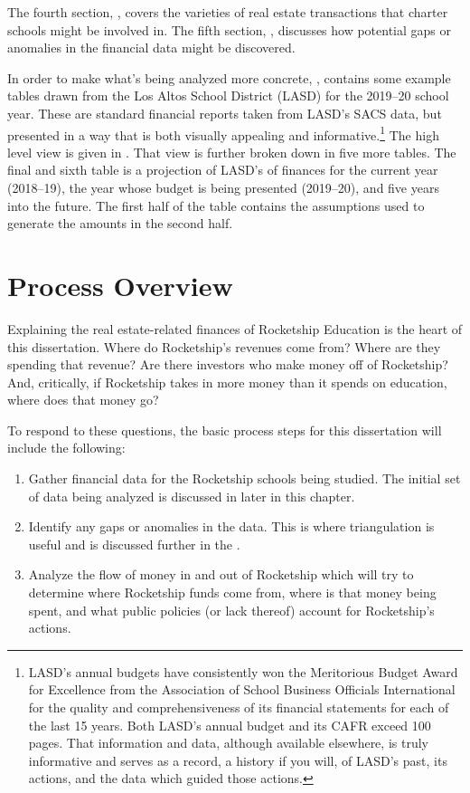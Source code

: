 The fourth section, , covers the varieties of real estate transactions that charter schools might be involved in. The fifth section, , discusses how potential gaps or anomalies in the financial data might be discovered. 

In order to make what's being analyzed more concrete, , contains some example tables drawn from the Los Altos School District (LASD) for the 2019–20 school year. These are standard financial reports taken from LASD's SACS data, but presented in a way that is both visually appealing and informative.\footnote{LASD's annual budgets have consistently won the Meritorious Budget Award for Excellence from the Association of School Business Officials International for the quality and comprehensiveness of its financial statements for each of the last 15 years. Both LASD's annual budget and its CAFR exceed 100 pages. That information and data, although available elsewhere, is truly informative and serves as a record, a history if you will, of LASD's past, its actions, and the data which guided those actions.} The high level view is given in . That view is further broken down in five more tables. The final and sixth table is a projection of LASD's of finances for the current year (2018–19), the year whose budget is being presented (2019–20), and five years into the future. The first half of the table contains the assumptions used to generate the amounts in the second half.

\section{Process Overview}\label{sec:process-overview}\indent

Explaining the real estate-related finances of Rocketship Education is the heart of this dissertation. Where do Rocketship's revenues come from? Where are they spending that revenue? Are there investors who make money off of Rocketship? And, critically, if Rocketship takes in more money than it spends on education, where does that money go?

To respond to these questions, the basic process steps for this dissertation will include the following:

\begin{enumerate}
  \item Gather financial data for the Rocketship schools being studied. The initial set of data being analyzed is discussed in  later in this chapter.
  \item Identify any gaps or anomalies in the data. This is where triangulation is useful and is discussed further in the . 
  \item Analyze the flow of money in and out of Rocketship which will try to determine where Rocketship funds come from, where is that money being spent, and what public policies (or lack thereof) account for Rocketship's actions.
\end{enumerate}

